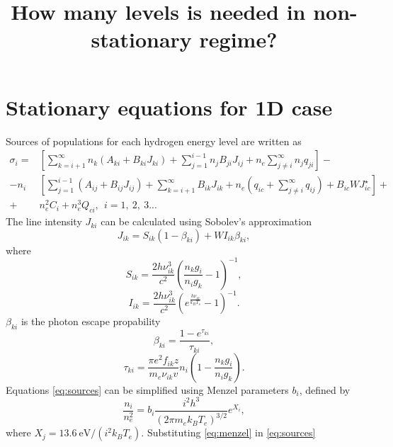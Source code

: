 \documentclass{article}
\title{How many levels is needed in non-stationary regime?}
\begin{document}
\maketitle
    
\section{Stationary equations for 1D case}

Sources of populations for each hydrogen energy level are written as
\begin{equation}\label{eq:sources}
    \begin{aligned}
    \sigma_i = & \left[\sum\limits_{k=i+1}^\infty n_k (A_{ki} + B_{ki}J_{ki}) + \sum\limits_{j=1}^{i-1} n_jB_{ji}J_{ij} +  n_e \sum\limits_{j\neq i}^\infty n_jq_{ji}\right] -  \\ 
    -n_i & \left[ \sum\limits_{j=1}^{i-1} (A_{ij} + B_{ij}J_{ij}) + \sum\limits_{k=i+1}^\infty B_{ik}J_{ik} + n_e ( q_{ic} + \sum\limits_{j \neq i}^\infty q_{ij} ) + B_{ic}WJ_{ic}^\star \right] +  \\
     +& n_e^2C_i + n_e^3Q_{ci},\ \ i=1,\ 2,\ 3... 
    \end{aligned}
\end{equation}
The line intensity \(J_{ki}\) can be calculated using Sobolev's approximation
\[
J_{ik} = S_{ik}(1 - \beta_{ki}) + WI_{ik}\beta_{ki},
\]
where
\[
S_{ik} = \frac{2h\nu_{ik}^3}{c^2}\left(\frac{n_kg_i}{n_ig_k} - 1\right)^{-1},
\]
\[
I_{ik} = \frac{2h\nu_{ik}^3}{c^2}\left(e^{\frac{h\nu_{ik}}{k_BT_s}} - 1\right)^{-1}.
\]
\(\beta_{ki}\) is the photon escape propability
\[
\beta_{ki} = \frac{1-e^{\tau_{ki}}}{\tau_{ki}},
\]
\[
\tau_{ki} = \frac{\pi e^2 f_{ik} z}{m_e \nu_{ik} v} n_i \left(1 - \frac{n_kg_i}{n_ig_k}\right).
\]
Equations \eqref{eq:sources} can be simplified using Menzel parameters \(b_i\), defined by
\begin{equation}\label{eq:menzel}
    \frac{n_i}{n_e^2} = b_i\frac{i^2h^3}{(2\pi m_ek_BT_e)^{3/2}}e^{X_i},
\end{equation}
where \(X_j = 13.6\ \mathrm{eV}/(i^2k_BT_e)\). Substituting \eqref{eq:menzel} in \eqref{eq:sources}
\end{document}
